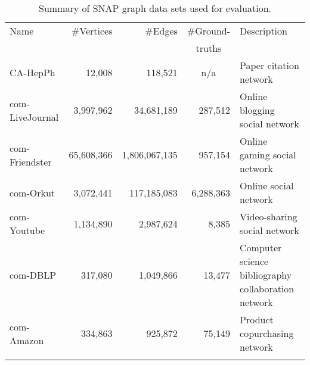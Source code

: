 \begin{table}
  \centering
  \def\tabcolsep{0.2em}
  \begin{tabular}{l r r r p{9em}}
    Name            & \#Vertices &       \#Edges & \multicolumn{1}{c}{\#Ground-} & Description \\
                    &            &               & \multicolumn{1}{c}{truths}    &             \\
    \hline
    CA-HepPh        &    12,008  &    118,521    & \multicolumn{1}{c}{n/a}       & Paper citation network \\
    com-LiveJournal &  3,997,962 &    34,681,189 & 287,512        & Online blogging social network \\
    com-Friendster  & 65,608,366 & 1,806,067,135 & 957,154        & Online gaming social network \\
    com-Orkut       &  3,072,441 &   117,185,083 & 6,288,363      & Online social network \\
    com-Youtube     &  1,134,890 &     2,987,624 & 8,385          & Video-sharing social network \\
    com-DBLP        &    317,080 &     1,049,866 & 13,477         & Computer science bibliography collaboration network \\
    com-Amazon      &    334,863 &       925,872 & 75,149         & Product copurchasing network \\
    \hline
    \\[-1ex]
  \end{tabular}
  \caption{Summary of SNAP graph data sets used for evaluation.}
  \label{table-snap}
\end{table}





